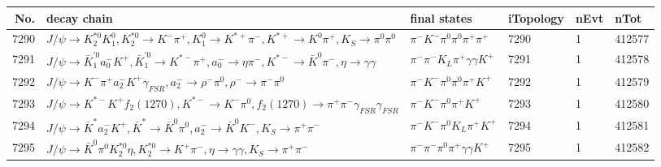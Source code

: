 \begin{table}[htbp] 
\begin{center}
\begin{small}
\begin{tabular}{rlllll}\hline\hline
 No. & decay chain & final states &  iTopology & nEvt & nTot \\\hline
7290&$J/\psi       \rightarrow K_2^{*0}       K_1^{0}        , K_2^{*0}        \rightarrow K^{-}          \pi^{+}        , K_1^{0}         \rightarrow K^{*+}         \pi^{-}        , K^{*+}          \rightarrow K^{0}          \pi^{+}        , K_{S}           \rightarrow \pi^{0}        \pi^{0}        $&$\pi^{-}        K^{-}          \pi^{0}        \pi^{0}        \pi^{+}        \pi^{+}        $& 7290&    1&412577\\
7291&$J/\psi       \rightarrow \bar{K}_1^{'0}a_{0}^{-}      K^{+}          , \bar{K}_1^{'0} \rightarrow K^{*-}         \pi^{+}        , a_{0}^{-}       \rightarrow \eta          \pi^{-}        , K^{*-}          \rightarrow \bar{K}^{0}   \pi^{-}        , \eta           \rightarrow \gamma       \gamma       $&$\pi^{-}        \pi^{-}        K_{L}          \pi^{+}        \gamma       \gamma       K^{+}          $& 7291&    1&412578\\
7292&$J/\psi       \rightarrow K^{-}          \pi^{+}        a_{2}^{-}      K^{+}          \gamma_{FSR} , a_{2}^{-}       \rightarrow \rho^{-}      \pi^{0}        , \rho^{-}       \rightarrow \pi^{-}        \pi^{0}        $&$\pi^{-}        K^{-}          \pi^{0}        \pi^{0}        \pi^{+}        K^{+}          $& 7292&    1&412579\\
7293&$J/\psi       \rightarrow K^{*-}         K^{+}          f_{2}(1270)    , K^{*-}          \rightarrow K^{-}          \pi^{0}        , f_{2}(1270)     \rightarrow \pi^{+}        \pi^{-}        \gamma_{FSR} \gamma_{FSR} $&$\pi^{-}        K^{-}          \pi^{0}        \pi^{+}        K^{+}          $& 7293&    1&412580\\
7294&$J/\psi       \rightarrow \bar{K}^{*}   a_{2}^{-}      K^{+}          , \bar{K}^{*}    \rightarrow \bar{K}^{0}   \pi^{0}        , a_{2}^{-}       \rightarrow \bar{K}^{0}   K^{-}          , K_{S}           \rightarrow \pi^{+}        \pi^{-}        $&$\pi^{-}        K^{-}          \pi^{0}        K_{L}          \pi^{+}        K^{+}          $& 7294&    1&412581\\
7295&$J/\psi       \rightarrow \bar{K}^{0}   \pi^{0}        K_2^{*0}       \eta          , K_2^{*0}        \rightarrow K^{+}          \pi^{-}        , \eta           \rightarrow \gamma       \gamma       , K_{S}           \rightarrow \pi^{+}        \pi^{-}        $&$\pi^{-}        \pi^{-}        \pi^{0}        \pi^{+}        \gamma       \gamma       K^{+}          $& 7295&    1&412582\\

\end{tabular}
\end{small}
\end{center}
\end{table}
